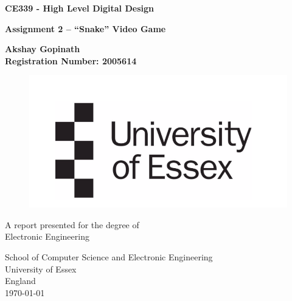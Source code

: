 \documentclass[aps, secnumarabic, balancelastpage, asmath, amssymb, nofootinbib, floatfix,]{revtex4-2}
\begin{document}
    \begin{titlepage}
   \begin{center}
       \vspace*{1cm}

	\Huge
       \textbf{CE339 - High Level Digital Design}

       \vspace{0.5cm}
       
       \LARGE
        \textbf{Assignment 2 -- ``Snake'' Video Game}
            
       \vspace{1.5cm}

       \textbf{Akshay Gopinath}\\
       \textbf{Registration Number: 2005614}

       \vfill
        \begin{figure}[h]
        
        \includegraphics[scale = 0.85]{University}
        
   	\end{figure}
        \vfill
            
       A report presented for the degree of\\
       Electronic Engineering
            
       \vspace{1cm}
     
            
       School of Computer Science and Electronic Engineering\\
       University of Essex\\
       England\\
       \today

   \end{center}
\end{titlepage}

\end{document}
